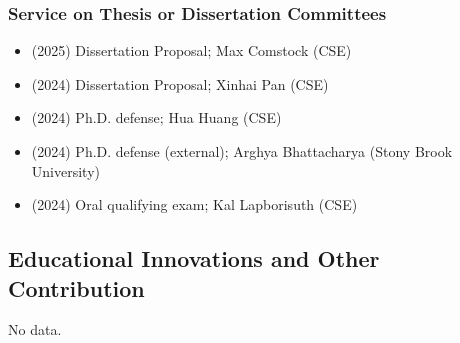 \begin{adjustwidth}{2em}{0pt}
\subsubsection{Service on Thesis or Dissertation Committees}

\begin{itemize}
    \item (2025) Dissertation Proposal; Max Comstock (CSE)
    \item (2024) Dissertation Proposal; Xinhai Pan (CSE)
    \item (2024) Ph.D. defense; Hua Huang (CSE)
     \item (2024) Ph.D. defense (external); Arghya Bhattacharya (Stony Brook University)
    \item (2024) Oral qualifying exam; Kal Lapborisuth (CSE)
\end{itemize}

\subsection{Educational Innovations and Other Contribution}


\iffalse
\begin{itemize}
    \item Nice educational innovation here
\end{itemize}
\fi
No data.


\end{adjustwidth}

